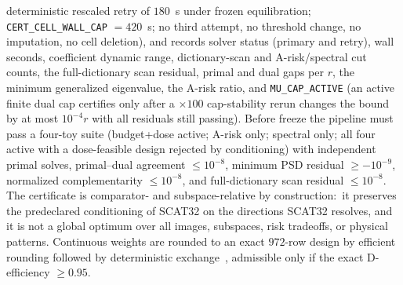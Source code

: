 \documentclass[10pt]{article}
\begin{document}
deterministic rescaled retry of $180$~s under frozen equilibration;
\texttt{CERT\_CELL\_WALL\_CAP} $= 420$~s; no third attempt, no threshold
change, no imputation, no cell deletion), and records solver status
(primary and retry), wall seconds, coefficient dynamic range,
dictionary-scan and A-risk/spectral cut counts, the full-dictionary scan
residual, primal and dual gaps per $r$, the minimum generalized eigenvalue,
the A-risk ratio, and \texttt{MU\_CAP\_ACTIVE} (an active finite dual cap
certifies only after a $\times100$ cap-stability rerun changes the bound by
at most $10^{-4}r$ with all residuals still passing). Before freeze the
pipeline must pass a four-toy suite (budget+dose active; A-risk only;
spectral only; all four active with a dose-feasible design rejected by
conditioning) with independent primal solves, primal--dual agreement
$\le10^{-8}$, minimum PSD residual $\ge-10^{-9}$, normalized
complementarity $\le10^{-8}$, and full-dictionary scan residual
$\le10^{-8}$. The certificate is comparator- and subspace-relative by
construction:\ it preserves the predeclared conditioning of \textsc{SCAT32}
on the directions \textsc{SCAT32} resolves, and it is not a global optimum
over all images, subspaces, risk tradeoffs, or physical patterns.
Continuous weights are rounded to an exact $972$-row design by efficient
rounding followed by deterministic
exchange~\cite{pukelsheim1992rounding,nikolov2022volume,sagnol2015exact},
admissible only if the exact D-efficiency $\ge 0.95$.
\end{document}
